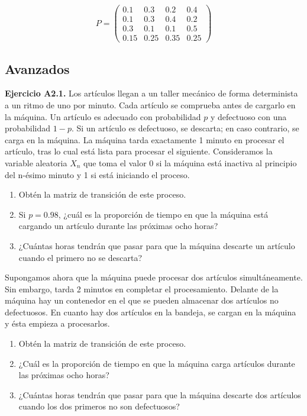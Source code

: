 \documentclass[
]{book}
\providecommand{\tightlist}{%
  \setlength{\itemsep}{0pt}\setlength{\parskip}{0pt}}
\theoremstyle{definition}
\theoremstyle{definition}
\theoremstyle{definition}
\theoremstyle{definition}
\theoremstyle{remark}
\begin{document}
\[P=\begin{pmatrix}
0.1 & 0.3 & 0.2 & 0.4 \\
0.1 & 0.3 & 0.4 & 0.2 \\
0.3 & 0.1 & 0.1 & 0.5 \\
0.15 & 0.25 & 0.35 & 0.25 
\end{pmatrix}\]

\hypertarget{avanzados-1}{%
\subsection{Avanzados}\label{avanzados-1}}

\textbf{Ejercicio A2.1.} Los artículos llegan a un taller mecánico de forma determinista a un ritmo de uno por minuto. Cada artículo se comprueba antes de cargarlo en la máquina. Un artículo es adecuado con probabilidad \(p\) y defectuoso con una probabilidad \(1-p\). Si un artículo es defectuoso, se descarta; en caso contrario, se carga en la máquina. La máquina tarda exactamente 1 minuto en procesar el artículo, tras lo cual está lista para procesar el siguiente. Consideramos la variable aleatoria \(X_n\) que toma el valor \(0\) si la máquina está inactiva al principio del n-ésimo minuto y 1 si está iniciando el proceso.

\begin{enumerate}
\def\labelenumi{\arabic{enumi}.}
\tightlist
\item
  Obtén la matriz de transición de este proceso.
\item
  Si \(p = 0.98\), ¿cuál es la proporción de tiempo en que la máquina está cargando un artículo durante las próximas ocho horas?
\item
  ¿Cuántas horas tendrán que pasar para que la máquina descarte un artículo cuando el primero no se descarta?
\end{enumerate}

Supongamos ahora que la máquina puede procesar dos artículos simultáneamente. Sin embargo, tarda 2 minutos en completar el procesamiento. Delante de la máquina hay un contenedor en el que se pueden almacenar dos artículos no defectuosos. En cuanto hay dos artículos en la bandeja, se cargan en la máquina y ésta empieza a procesarlos.

\begin{enumerate}
\def\labelenumi{\arabic{enumi}.}
\setcounter{enumi}{3}
\tightlist
\item
  Obtén la matriz de transición de este proceso.
\item
  ¿Cuál es la proporción de tiempo en que la máquina carga artículos durante las próximas ocho horas?
\item
  ¿Cuántas horas tendrán que pasar para que la máquina descarte dos artículos cuando los dos primeros no son defectuosos?
\end{enumerate}
\end{document}
